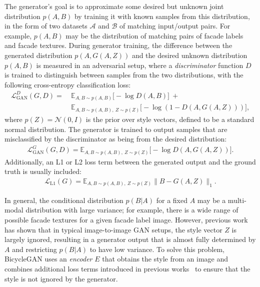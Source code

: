 The generator's goal is to approximate some desired but unknown joint distribution $p(A,B)$ by training it with known samples from this distribution, in the form of two datasets $\mathcal{A}$ and $\mathcal{B}$ of matching input/output pairs. For example, $p(A,B)$ may be the distribution of matching pairs of facade labels and facade textures. During generator training, the difference between the generated distribution $p(A,G(A,Z))$ and the desired unknown distribution $p(A,B)$ is measured in an adversarial setup, where a \emph{discriminator} function $D$ is trained to distinguish between samples from the two distributions, with the following cross-entropy classification loss:
\begin{equation}
\begin{aligned}
\label{eq:loss_gan_d}
    \mathcal{L}^D_{\textrm{GAN}}(G,D) =\ & \mathbb{E}_{A,B \sim p(A,B)} \bigl[-\log D(A,B)\bigr]\ + \\
    & \mathbb{E}_{A,B \sim p(A,B),\ Z \sim p(Z)}\bigl[-\log \left(1-D(A,G(A,Z))\right)\bigr],
\end{aligned}
\end{equation}
where $p(Z) = \mathcal{N}(0,I)$ is the prior over style vectors, defined to be a standard normal distribution. The generator is trained to output samples that are misclassified by the discriminator as being from the desired distribution:
\begin{align}
\label{eq:loss_gan_g}
    \mathcal{L}^G_{\textrm{GAN}}(G,D) = \mathbb{E}_{A,B \sim p(A,B),\ Z \sim p(Z)}\bigl[-\log D(A,G(A,Z))\bigr].
\end{align}
Additionally, an L1 or L2 loss term between the generated output and the ground truth is usually included:
\begin{align}
\label{eq:loss_gan_l1}
    \mathcal{L}_{\textrm{L1}}(G) = \mathbb{E}_{A,B \sim p(A,B),\ Z \sim p(Z)}\bigl\|B-G(A,Z)\bigr\|_1.
\end{align}

In general, the conditional distribution $p(B|A)$ for a fixed $A$ may be a multi-modal distribution with large variance; for example, there is a wide range of possible facade textures for a given facade label image. However, previous work~\cite{pix2pix} has shown that in typical image-to-image GAN setups, the style vector $Z$ is largely ignored, resulting in a generator output that is almost fully determined by $A$ and restricting $p(B|A)$ to have low variance. To solve this problem, BicycleGAN uses an \emph{encoder} $E$ that obtains the style from an image and combines additional loss terms introduced in previous works~\cite{Donahue:2016:afl,Dumoulin:2016:ali,vae_gan} to ensure that the style is not ignored by the generator.

